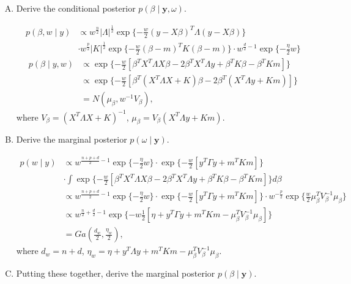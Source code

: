 \documentclass[11pt]{article}
\newcommand{\by}{\textbf{y}}
\newcommand{\half}{\frac{1}{2}}
\begin{document}
\begin{enumerate}[(A)]

\item Derive the conditional posterior $p(\beta \mid \by, \omega)$.

\begin{align*}
    p(\beta,w \mid y) &\propto w^{\frac{n}{2}} |\Lambda|^{\half} \exp\{-\frac{w}{2}(y-X\beta)^T\Lambda(y-X\beta) \} \\& \cdot w^{\frac{p}{2}} |K|^{\half} \exp\{-\frac{w}{2} (\beta - m)^T K(\beta-m) \} \cdot w^{\frac{d}{2}-1} \exp\{-\frac{\eta}{2}w\}
\end{align*}
\begin{align*}
    p(\beta \mid y,w) &\propto \exp \{-\frac{w}{2} [\beta^TX^T\Lambda X \beta - 2\beta^T X^T \Lambda y + \beta^T K \beta - \beta^T K m]\} \\
    &\propto \exp \{-\frac{w}{2} [\beta^T (X^T\Lambda X + K) \beta - 2\beta^T(X^T \Lambda y + K m)]\} \\
    &= N(\mu_\beta, w^{-1}V_\beta),
\end{align*}
where $V_\beta = (X^T \Lambda X + K)^{-1}$, $\mu_\beta = V_\beta (X^T \Lambda y + Km)$.

\item Derive the marginal posterior $p(\omega \mid \by)$.

\begin{align*}
    p(w \mid y) &\propto w^{\frac{n+p+d}{2} -1} \exp\{-\frac{\eta}{2}w\} \cdot \exp\{-\frac{w}{2}[y^T\Gamma y + m^T K m]\} \\&\cdot \int \exp \{ -\frac{w}{2} [\beta^TX^T\Lambda X \beta - 2\beta^T X^T \Lambda y + \beta^T K \beta - \beta^T K m]  \} d\beta \\
    &\propto w^{\frac{n+p+d}{2} -1} \exp\{-\frac{\eta}{2}w\} \cdot \exp\{-\frac{w}{2}[y^T\Gamma y + m^T K m]\} \cdot w^{-\frac{p}{2}} \exp\{\frac{w}{2} \mu_\beta^T V_\beta^{-1} \mu_\beta \} \\
    &\propto w^{\frac{n}{2}+\frac{d}{2} -1} \exp\{ -w \half[\eta + y^T\Gamma y + m^T K m - \mu_\beta^T V_\beta^{-1} \mu_\beta ] \} \\
    &= Ga(\frac{d_w}{2}, \frac{\eta_w}{2}),
\end{align*}
where $d_w = n+ d$, $\eta_w = \eta + y^T\Lambda y + m^T K m - \mu_\beta^T V_\beta^{-1} \mu_\beta $.

\item Putting these together, derive the marginal posterior $p(\beta \mid \by)$.


\end{enumerate}
\end{document}
